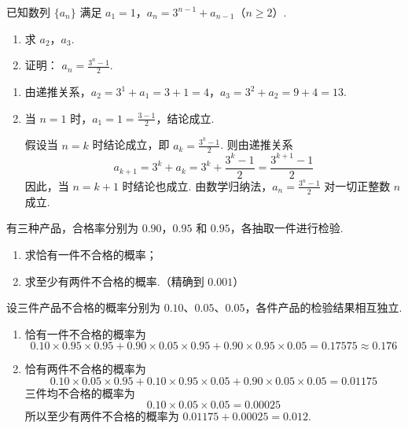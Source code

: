 \begin{problem}
已知数列 \(\{a_{n}\}\) 满足 \(a_{1} = 1\)，\(a_{n} = 3^{n - 1} + a_{n - 1}\)（\(n \geqslant 2\)）.

\begin{enumerate}
\item 求 \(a_{2}\)，\(a_{3}\).
\item 证明： \(a_{n} = \frac{3^{n} - 1}{2}\).
\end{enumerate}

\begin{solution}
\begin{enumerate}
\item 由递推关系，\(a_{2}=3^{1}+a_{1}=3+1=4\)，\(a_{3}=3^{2}+a_{2}=9+4=13\).

\item 当 \(n=1\) 时，\(a_{1}=1=\frac{3-1}{2}\)，结论成立.

假设当 \(n=k\) 时结论成立，即 \(a_{k}=\frac{3^{k}-1}{2}\). 则由递推关系
\[
a_{k+1}=3^{k}+a_{k}=3^{k}+\frac{3^{k}-1}{2}=\frac{3^{k+1}-1}{2}
\]
因此，当 \(n=k+1\) 时结论也成立. 由数学归纳法，\(a_{n}=\frac{3^{n}-1}{2}\) 对一切正整数 \(n\) 成立.
\end{enumerate}
\end{solution}
\end{problem}

\begin{problem}
有三种产品，合格率分别为 \(0.90\)，\(0.95\) 和 \(0.95\)，各抽取一件进行检验.

\begin{enumerate}
\item 求恰有一件不合格的概率；
\item 求至少有两件不合格的概率.（精确到 \(0.001\)）
\end{enumerate}

\begin{solution}
设三件产品不合格的概率分别为 \(0.10\)、\(0.05\)、\(0.05\)，各件产品的检验结果相互独立.

\begin{enumerate}
\item 恰有一件不合格的概率为
\[
0.10\times0.95\times0.95+0.90\times0.05\times0.95+0.90\times0.95\times0.05=0.17575\approx0.176
\]

\item 恰有两件不合格的概率为
\[
0.10\times0.05\times0.95+0.10\times0.95\times0.05+0.90\times0.05\times0.05=0.01175
\]
三件均不合格的概率为
\[
0.10\times0.05\times0.05=0.00025
\]
所以至少有两件不合格的概率为 \(0.01175+0.00025=0.012\).
\end{enumerate}
\end{solution}
\end{problem}

